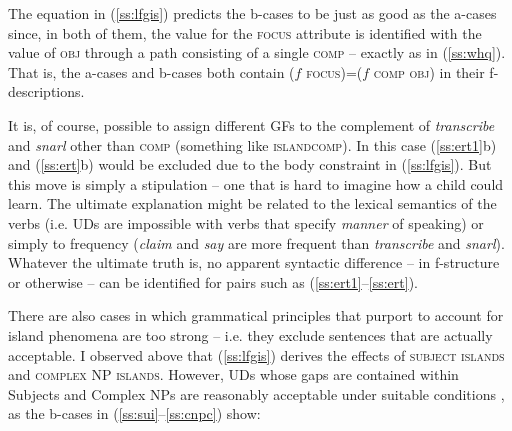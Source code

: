 \documentclass[output=paper,hidelinks]{langscibook}
\begin{document}
The equation in (\ref{ss:lfgis}) predicts the b-cases to be just as good as the a-cases since, in both of them, the value for the \textsc{focus} attribute is identified with the value of \textsc{obj} through a path consisting of a single \textsc{comp} -- exactly as in (\ref{ss:whq}). That is, the a-cases and b-cases both contain ($f$ \textsc{focus})=($f$ \textsc{comp obj}) in their f-descriptions.

It is, of course, possible to assign different GFs to the complement of \textit{transcribe} and \textit{snarl} other than \textsc{comp} (something like \textsc{islandcomp}). In this case (\ref{ss:ert1}b) and (\ref{ss:ert}b) would be excluded due to the body constraint in (\ref{ss:lfgis}). But this move is simply a stipulation -- one that is hard to imagine how a child could learn. The ultimate explanation might be related to the lexical semantics of the verbs (i.e. UDs are impossible with verbs that specify \textit{manner} of speaking) or simply to frequency (\textit{claim} and \textit{say} are more frequent than \textit{transcribe} and \textit{snarl}). Whatever the ultimate truth is, no apparent syntactic difference -- in f-structure or otherwise -- can be identified for pairs such as (\ref{ss:ert1}--\ref{ss:ert}).

There are also cases in which grammatical principles that purport to account for island phenomena are too strong -- i.e. they exclude sentences that are actually acceptable. I observed above that (\ref{ss:lfgis}) derives the effects of \textsc{subject islands} and \textsc{complex NP islands}. However, UDs whose gaps are contained within Subjects and Complex NPs  are reasonably acceptable under suitable conditions \citep{kluender2004subject, sag2007processing, chaves2013expectation}, as the b-cases in (\ref{ss:sui}--\ref{ss:cnpc}) show:


\begin{exe}
\ex\label{ss:sui}
\begin{xlist}
\end{xlist}
\end{exe}

\begin{exe}
\ex\label{ss:cnpc}
\begin{xlist}
\end{xlist}
\end{exe}
\end{document}
